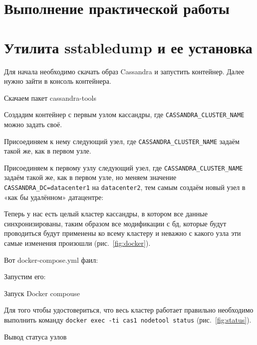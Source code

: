 \graphicspath{{/img}} %


\section*{\LARGE Выполнение практической работы}

\section{Утилита sstabledump и ее установка}

Для начала необходимо скачать образ Cassandra и запустить контейнер.
Далее нужно зайти в консоль контейнера.


Скачаем пакет cassandra-tools
\



Создадим контейнер с первым узлом кассандры, где
\texttt{CASSANDRA\_CLUSTER\_NAME} можно задать своё.

Присоединяем к нему следующий узел, где
\texttt{CASSANDRA\_CLUSTER\_NAME} задаём такой же, как в первом узле.

Присоединяем к первому узлу следующий узел, где
\texttt{CASSANDRA\_CLUSTER\_NAME} задаём такой же, как в первом узле,
но меняем значение \texttt{CASSANDRA\_DC=datacenter1} на \texttt{datacenter2},
тем самым создаём новый узел в «как бы удалённом» датацентре:

Теперь у нас есть целый кластер кассандры, в котором все данные
синхронизированы, таким образом все модификации с бд, которые
будут проводиться будут применены ко всему кластеру и неважно с
какого узла эти самые изменения произошли (рис.~\ref{fig:docker}).

Вот docker-compose.yml фаил:



Запустим его:

\begin{image}
	\caption{Запуск Docker compouse}
	\label{fig:docker}
\end{image}

Для того чтобы удостовериться, что весь кластер работает правильно
необходимо выполнить команду \texttt{docker exec -ti cas1 nodetool status}
(рис.~\ref{fig:status}).

\begin{image}
	\caption{Вывод статуса узлов}
	\label{fig:status}
\end{image}

